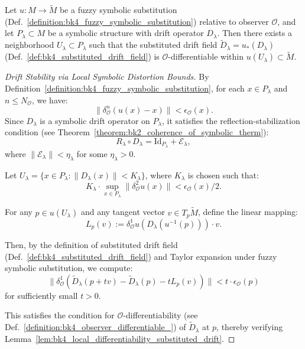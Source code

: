\begin{lemma}
\label{lem:bk4_local_differentiability_substituted_drift}
Let $u : M \to \tilde{M}$ be a fuzzy symbolic substitution (Def.~\ref{definition:bk4_fuzzy_symbolic_substitution}) relative to observer $\mathcal{O}$, and let $P_\lambda \subset M$ be a symbolic structure with drift operator $D_\lambda$. Then there exists a neighborhood $U_\lambda \subset P_\lambda$ such that the substituted drift field $\tilde{D}_\lambda = u_*(D_\lambda)$ (Def.~\ref{def:bk4_substituted_drift_field}) is $\mathcal{O}$-differentiable within $u(U_\lambda) \subset \tilde{M}$.
\end{lemma}
\begin{proof}[Drift Stability via Local Symbolic Distortion Bounds]
\label{proof:bk4_drift_stability_local_bounds}
By Definition~\ref{definition:bk4_fuzzy_symbolic_substitution}, for each $x \in P_\lambda$ and $n \leq N_\mathcal{O}$, we have:
\[
\| \delta^n_\mathcal{O}(u(x) - x) \| < \epsilon_\mathcal{O}(x).
\]
Since $D_\lambda$ is a symbolic drift operator on $P_\lambda$, it satisfies the reflection-stabilization condition (see Theorem~\ref{theorem:bk2_coherence_of_symbolic_therm}):
\[
R_\lambda \circ D_\lambda = \text{Id}_{P_\lambda} + \mathcal{E}_\lambda,
\]
where $\|\mathcal{E}_\lambda\| < \eta_\lambda$ for some $\eta_\lambda > 0$.

Let $U_\lambda = \{x \in P_\lambda : \|D_\lambda(x)\| < K_\lambda\}$, where $K_\lambda$ is chosen such that:
\[
K_\lambda \cdot \sup_{x \in P_\lambda}\|\delta^2_\mathcal{O}u(x)\| < \epsilon_\mathcal{O}(x)/2.
\]

For any $p \in u(U_\lambda)$ and any tangent vector $v \in T_p\tilde{M}$, define the linear mapping:
\[
L_p(v) := \delta^1_\mathcal{O}u(D_\lambda(u^{-1}(p))) \cdot v.
\]

Then, by the definition of substituted drift field (Def.~\ref{def:bk4_substituted_drift_field}) and Taylor expansion under fuzzy symbolic substitution, we compute:
\[
\|\delta^1_\mathcal{O}(\tilde{D}_\lambda(p+tv) - \tilde{D}_\lambda(p) - tL_p(v))\| < t \cdot \epsilon_\mathcal{O}(p)
\]
for sufficiently small $t > 0$.

This satisfies the condition for $\mathcal{O}$-differentiability (see Def.~\ref{definition:bk4_observer_differentiable_}) of $\tilde{D}_\lambda$ at $p$, thereby verifying Lemma~\ref{lem:bk4_local_differentiability_substituted_drift}.
\end{proof}

